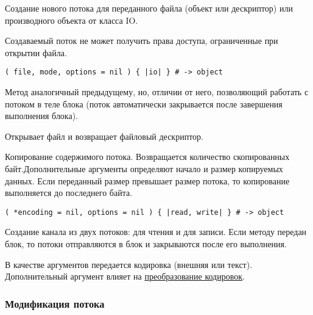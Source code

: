\begin{methodlist}
  Создание нового потока для переданного файла (объект или дескриптор) или производного объекта от класса IO.

  Создаваемый поток не может получить права доступа, ограниченные при открытии файла.
  
  \verb!( file, mode, options = nil ) { |io| } # -> object!

  Метод аналогичный предыдущему, но, отличии от него, позволяющий работать с потоком в теле блока (поток автоматически закрывается после завершения выполнения блока). 

  Открывает файл и возвращает файловый дескриптор.

  Копирование содержимого потока. Возвращается количество скопированных байт.Дополнительные аргументы определяют начало и размер копируемых данных. Если переданный размер превышает размер потока, то копирование выполняется до последнего байта. 

  \verb!( *encoding = nil, options = nil ) { |read, write| } # -> object!

  Создание канала из двух потоков: для чтения и для записи. Если методу передан блок, то потоки отправляются в блок и закрываются после его выполнения.

  В качестве аргументов передается кодировка (внешняя или текст). Дополнительный аргумент влияет на \hyperlink{appencode}{\underline{преобразование кодировок}}.  
\end{methodlist}

\subsubsection*{Модификация потока}

